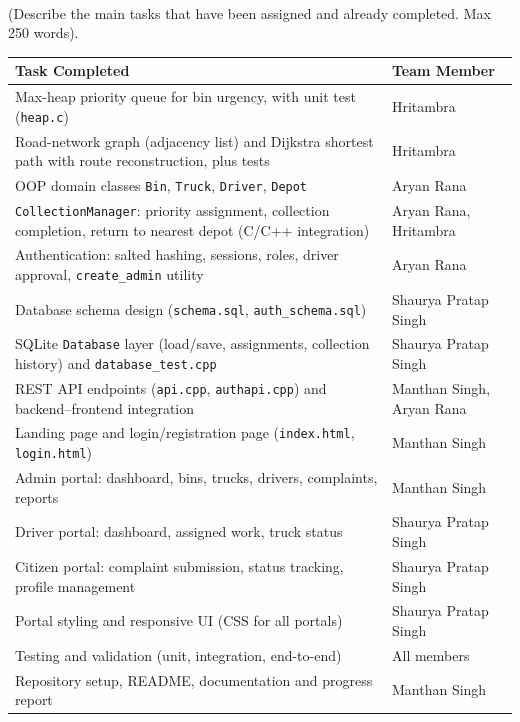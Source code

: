 \documentclass[11pt,a4paper]{article}
\newcommand{\qhead}[2]{\vspace{8pt}{\color{subhead}\LARGE #1}\\[-1pt]{\color{hint}\small #2}\par\vspace{2pt}}
\begin{document}
\newpage
\qhead{Tasks Completed (7 pts)}{(Describe the main tasks that have been assigned and already completed. Max 250 words).}
{\small
\renewcommand{\arraystretch}{1.2}
\begin{tabularx}{\linewidth}{|X|p{4.6cm}|}
\hline
\textbf{Task Completed} & \textbf{Team Member} \\ \hline
Max-heap priority queue for bin urgency, with unit test (\texttt{heap.c}) & Hritambra \\ \hline
Road-network graph (adjacency list) and Dijkstra shortest path with route reconstruction, plus tests & Hritambra \\ \hline
OOP domain classes \texttt{Bin}, \texttt{Truck}, \texttt{Driver}, \texttt{Depot} & Aryan Rana \\ \hline
\texttt{CollectionManager}: priority assignment, collection completion, return to nearest depot (C/C++ integration) & Aryan Rana, Hritambra \\ \hline
Authentication: salted hashing, sessions, roles, driver approval, \texttt{create\_admin} utility & Aryan Rana \\ \hline
Database schema design (\texttt{schema.sql}, \texttt{auth\_schema.sql}) & Shaurya Pratap Singh \\ \hline
SQLite \texttt{Database} layer (load/save, assignments, collection history) and \texttt{database\_test.cpp} & Shaurya Pratap Singh \\ \hline
REST API endpoints (\texttt{api.cpp}, \texttt{authapi.cpp}) and backend--frontend integration & Manthan Singh, Aryan Rana \\ \hline
Landing page and login/registration page (\texttt{index.html}, \texttt{login.html}) & Manthan Singh \\ \hline
Admin portal: dashboard, bins, trucks, drivers, complaints, reports & Manthan Singh \\ \hline
Driver portal: dashboard, assigned work, truck status & Shaurya Pratap Singh \\ \hline
Citizen portal: complaint submission, status tracking, profile management & Shaurya Pratap Singh \\ \hline
Portal styling and responsive UI (CSS for all portals) & Shaurya Pratap Singh \\ \hline
Testing and validation (unit, integration, end-to-end) & All members \\ \hline
Repository setup, README, documentation and progress report & Manthan Singh \\ \hline
\end{tabularx}}
\end{document}
